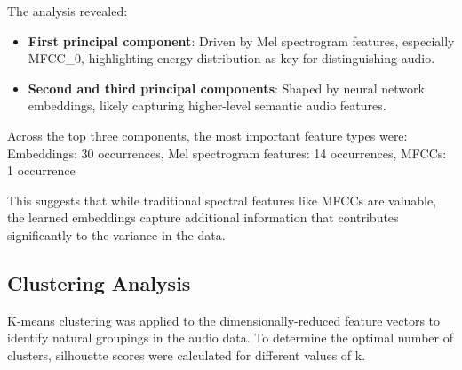 \documentclass{article}
\begin{document}
The analysis revealed:
\begin{itemize}
    \item \textbf{First principal component}: Driven by Mel spectrogram features, especially MFCC\_0, highlighting energy distribution as key for distinguishing audio.
    \item \textbf{Second and third principal components}: Shaped by neural network embeddings, likely capturing higher-level semantic audio features.
\end{itemize}

Across the top three components, the most important feature types were: Embeddings: 30 occurrences, Mel spectrogram features: 14 occurrences, MFCCs: 1 occurrence

This suggests that while traditional spectral features like MFCCs are valuable, the learned embeddings capture additional information that contributes significantly to the variance in the data.

\subsection{Clustering Analysis}

K-means clustering was applied to the dimensionally-reduced feature vectors to identify natural groupings in the audio data. To determine the optimal number of clusters, silhouette scores were calculated for different values of k.
\end{document}
